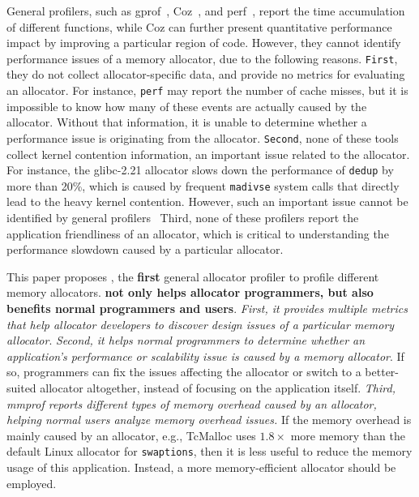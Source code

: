 General profilers, such as gprof~\citep{DBLP:conf/sigplan/GrahamKM82}, Coz~\citep{Coz}, and perf~\citep{perf}, report the time accumulation of different functions, while Coz can further present quantitative performance impact by improving a particular region of code. However, they cannot identify performance issues of a memory allocator, due to the following reasons. \texttt{First}, they do not collect allocator-specific data, and provide no metrics for evaluating an allocator. For instance, \texttt{perf} may report the number of cache misses, but it is impossible to know how many of these events are actually caused by the allocator. Without that information, it is unable to determine whether a performance issue is originating from the allocator. \texttt{Second}, none of these tools collect kernel contention information, an important issue related to the allocator. For instance, the glibc-2.21 allocator slows down the performance of \texttt{dedup} by more than 20\%, which is caused by frequent \texttt{madivse} system calls that directly lead to the heavy kernel contention. However, such an important issue cannot be identified by general profilers~\citep{DBLP:conf/sigplan/GrahamKM82, Coz, perf}%
Third, none of these profilers report the application friendliness of an allocator, which is critical to understanding the performance slowdown caused by a particular allocator.   

This paper proposes \MP{}, the \textbf{first} general allocator profiler to profile different memory allocators. \textbf{\MP{} not only helps allocator programmers, but also benefits normal programmers and users}. \textit{First, it provides multiple metrics that help allocator developers to discover design issues of a particular memory allocator}. \textit{Second, it helps normal programmers to determine whether an application's performance or scalability issue is caused by a memory allocator}. 
If so, programmers can fix the issues affecting the allocator or switch to a better-suited allocator altogether, instead of focusing on the application itself. 
\textit{Third, mmprof reports different types of memory overhead caused by an allocator, helping normal users analyze memory overhead issues.} 
If the memory overhead is mainly caused by an allocator, e.g., TcMalloc uses $1.8\times$ more memory than the default Linux allocator for \texttt{swaptions}, then it is less useful to reduce the memory usage of this application. Instead, a more memory-efficient allocator should be employed.   


